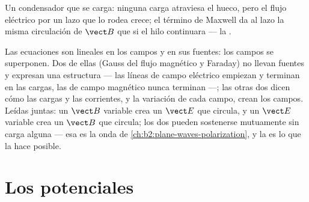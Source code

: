 \begin{omfigure}

{\small Un condensador que se carga: ninguna carga atraviesa el hueco,
pero el flujo eléctrico por un lazo que lo rodea crece; el término de
Maxwell da al lazo la misma circulación de $\vect B$ que si el hilo
continuara --- la .}
\end{omfigure}

\begin{remark}\label{rem:b2:maxwell-equations:linearity}
Las ecuaciones son lineales en los campos y en sus fuentes: los campos se
superponen. Dos de ellas (Gauss del flujo magnético y Faraday) no llevan
fuentes y expresan una estructura --- las líneas de campo eléctrico
empiezan y terminan en las cargas, las de campo magnético nunca terminan
---; las otras dos dicen cómo las cargas y las corrientes, y la variación
de cada campo, crean los campos. Leídas juntas: un $\vect B$ variable crea
un $\vect E$ que circula, y un $\vect E$ variable crea un $\vect B$ que circula;
los dos pueden sostenerse mutuamente sin carga alguna --- esa es la onda de
\cref{ch:b2:plane-waves-polarization}, y la  es
lo que la hace posible.
\end{remark}

\section{Los potenciales}

